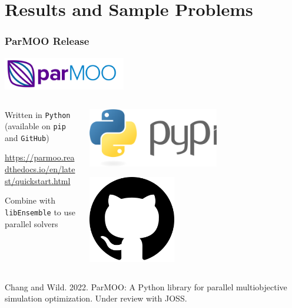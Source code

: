 \documentclass[aspectratio=169]{beamer}
\begin{document}
\section{Results and Sample Problems}

\begin{frame}\frametitle{ParMOO Release}

\begin{center}
\includegraphics[width=0.4\textwidth]{logo-parmoo.png}
\end{center}

\begin{columns}
\begin{column}{0.8\textwidth}

Written in {\tt Python} (available on {\tt pip} and {\tt GitHub})

\bigskip
\bigskip
\url{https://parmoo.readthedocs.io/en/latest/quickstart.html}

\bigskip
\bigskip
Combine with {\tt libEnsemble} to use parallel solvers
\end{column}
\begin{column}{0.2\textwidth}
\includegraphics[width=0.6\textwidth]{logo-py.png}

\bigskip

\includegraphics[width=0.4\textwidth]{logo-gh.png}
\end{column}
\end{columns}

\bigskip
\bigskip

{\small
Chang and Wild. 2022.
ParMOO: A Python library for parallel multiobjective simulation optimization.
Under review with JOSS.
}

\end{frame}
\end{document}

